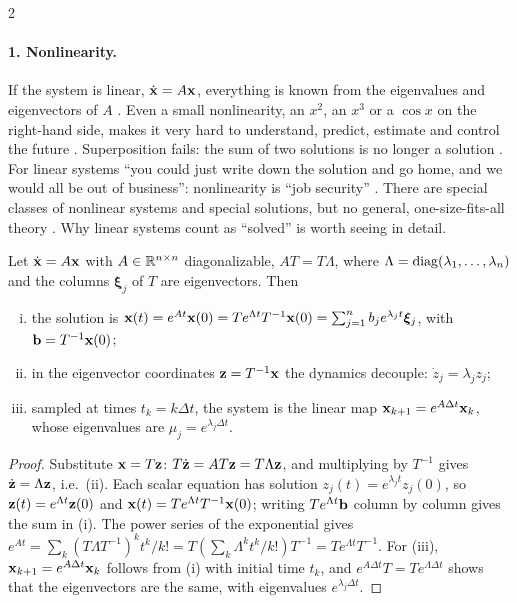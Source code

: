 \begin{paracol}{2}
\paragraph{1. Nonlinearity.} If the system is linear, $\dot{\mathbf{x}}=A\mathbf{x}$, everything is known
from the eigenvalues and eigenvectors of $A$ . Even a small nonlinearity, an $x^2$, an
$x^3$ or a $\cos x$ on the right-hand side, makes it very hard to understand, predict, estimate and
control the future . Superposition fails: the sum of two solutions is no longer a
solution . For linear systems ``you could just write down the solution and go home,
and we would all be out of business'': nonlinearity is ``job security'' . There are
special classes of nonlinear systems and special solutions, but no general, one-size-fits-all theory
. Why linear systems count as ``solved'' is worth seeing in detail.

\begin{proposition}\label{prop:ov-linear}
Let $\dot{\mathbf{x}}=A\mathbf{x}$ with $A\in\mathbb{R}^{n\times n}$ diagonalizable, $AT=T\Lambda$, where
$\Lambda=\operatorname{diag}(\lambda_1,\dots,\lambda_n)$ and the columns $\boldsymbol\xi_j$ of $T$ are eigenvectors.
Then
\begin{enumerate}[(i)]
  \item the solution is $\mathbf{x}(t)=e^{At}\mathbf{x}(0)=T e^{\Lambda t}T^{-1}\mathbf{x}(0)
        =\sum_{j=1}^n b_j e^{\lambda_j t}\boldsymbol\xi_j$, with $\mathbf{b}=T^{-1}\mathbf{x}(0)$;
  \item in the eigenvector coordinates $\mathbf{z}=T^{-1}\mathbf{x}$ the dynamics decouple: $\dot z_j=\lambda_j z_j$;
  \item sampled at times $t_k=k\Delta t$, the system is the linear map $\mathbf{x}_{k+1}=e^{A\Delta t}\mathbf{x}_k$,
        whose eigenvalues are $\mu_j=e^{\lambda_j\Delta t}$.
\end{enumerate}
\end{proposition}
\begin{proof}
Substitute $\mathbf{x}=T\mathbf{z}$: $T\dot{\mathbf{z}}=AT\mathbf{z}=T\Lambda\mathbf{z}$, and multiplying by $T^{-1}$ gives
$\dot{\mathbf{z}}=\Lambda\mathbf{z}$, i.e.\ (ii). Each scalar equation has solution $z_j(t)=e^{\lambda_jt}z_j(0)$,
so $\mathbf{z}(t)=e^{\Lambda t}\mathbf{z}(0)$ and $\mathbf{x}(t)=Te^{\Lambda t}T^{-1}\mathbf{x}(0)$; writing $T e^{\Lambda t}\mathbf{b}$
column by column gives the sum in (i). The power series of the exponential gives
$e^{At}=\sum_k (T\Lambda T^{-1})^kt^k/k!=T(\sum_k\Lambda^kt^k/k!)T^{-1}=Te^{\Lambda t}T^{-1}$.
For (iii), $\mathbf{x}_{k+1}=e^{A\Delta t}\mathbf{x}_k$ follows from (i) with initial time $t_k$, and
$e^{A\Delta t}T=Te^{\Lambda\Delta t}$ shows that the eigenvectors are the same, with eigenvalues
$e^{\lambda_j\Delta t}$.
\end{proof}


\end{paracol}
